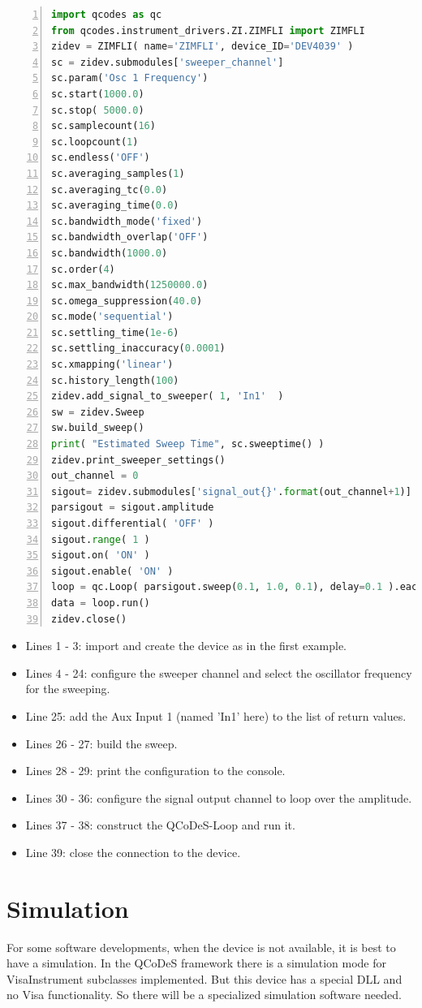 \documentclass[11pt]{article} %
\begin{document}
\begin{lstlisting}[frame=single, language=Python, numbers=left, xleftmargin=1cm]
import qcodes as qc
from qcodes.instrument_drivers.ZI.ZIMFLI import ZIMFLI
zidev = ZIMFLI( name='ZIMFLI', device_ID='DEV4039' )
sc = zidev.submodules['sweeper_channel']
sc.param('Osc 1 Frequency')
sc.start(1000.0)
sc.stop( 5000.0)
sc.samplecount(16)
sc.loopcount(1)
sc.endless('OFF')
sc.averaging_samples(1)
sc.averaging_tc(0.0)
sc.averaging_time(0.0)
sc.bandwidth_mode('fixed')
sc.bandwidth_overlap('OFF')
sc.bandwidth(1000.0)
sc.order(4)
sc.max_bandwidth(1250000.0)
sc.omega_suppression(40.0)
sc.mode('sequential')
sc.settling_time(1e-6)
sc.settling_inaccuracy(0.0001)
sc.xmapping('linear')
sc.history_length(100)
zidev.add_signal_to_sweeper( 1, 'In1'  )
sw = zidev.Sweep
sw.build_sweep()
print( "Estimated Sweep Time", sc.sweeptime() )
zidev.print_sweeper_settings()
out_channel = 0
sigout= zidev.submodules['signal_out{}'.format(out_channel+1)]
parsigout = sigout.amplitude
sigout.differential( 'OFF' )
sigout.range( 1 )
sigout.on( 'ON' )
sigout.enable( 'ON' )
loop = qc.Loop( parsigout.sweep(0.1, 1.0, 0.1), delay=0.1 ).each( sw )
data = loop.run()
zidev.close()
\end{lstlisting}

\begin{itemize}[]
\itemsep0pt
\item Lines 1 - 3: import and create the device as in the first example.
\item Lines 4 - 24: configure the sweeper channel and select the oscillator frequency for the sweeping.
\item Line 25: add the Aux Input 1 (named 'In1' here) to the list of return values.
\item Lines 26 - 27: build the sweep.
\item Lines 28 - 29: print the configuration to the console.
\item Lines 30 - 36: configure the signal output channel to loop over the amplitude.
\item Lines 37 - 38: construct the QCoDeS-Loop and run it.
\item Line 39: close the connection to the device.
\end{itemize}

\clearpage

\section{Simulation}
For some software developments, when the device is not available, it is best to have a simulation. In the QCoDeS framework there is a simulation mode for VisaInstrument subclasses implemented. But this device has a special DLL and no Visa functionality. So there will be a specialized simulation software needed.
\end{document}

